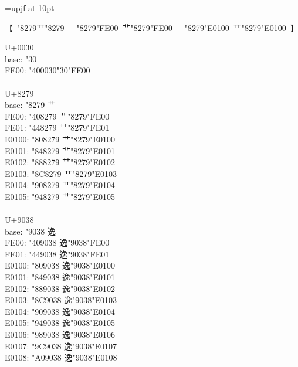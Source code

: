 \documentclass{ujarticle}
\begin{document}
\pagestyle{empty}
\parindent0pt
\begin{multicols*}{4}

\newcommand{\VS}{\\}
\font\upjf=upjf at 10pt
\upjf

\hbox{【
 \kchar"8279艹\Uchar"8279 ~%
 \kchar"8279\kchar"FE00 艹︀\Uchar"8279\Uchar"FE00 ~%
 \kchar"8279\kchar"E0100 艹󠄀\Uchar"8279\Uchar"E0100 %
】}

U+0030\\
base: \kchar"30\\
FE00: \kchar"400030\kchar"30\kchar"FE00\\
\VS
U+8279\\
base: \kchar"8279 艹\\
FE00: \kchar"408279 艹︀\kchar"8279\kchar"FE00\\
FE01: \kchar"448279 艹︁\kchar"8279\kchar"FE01\\
E0100: \kchar"808279 艹󠄀\kchar"8279\kchar"E0100\\
E0101: \kchar"848279 艹󠄁\kchar"8279\kchar"E0101\\
E0102: \kchar"888279 艹󠄂\kchar"8279\kchar"E0102\\
E0103: \kchar"8C8279 艹󠄃\kchar"8279\kchar"E0103\\
E0104: \kchar"908279 艹󠄄\kchar"8279\kchar"E0104\\
E0105: \kchar"948279 艹󠄅\kchar"8279\kchar"E0105\\
\VS
U+9038\\
base: \kchar"9038 逸\\
FE00: \kchar"409038 逸︀\kchar"9038\kchar"FE00\\
FE01: \kchar"449038 逸︁\kchar"9038\kchar"FE01\\
E0100: \kchar"809038 逸󠄀\kchar"9038\kchar"E0100\\
E0101: \kchar"849038 逸󠄁\kchar"9038\kchar"E0101\\
E0102: \kchar"889038 逸󠄂\kchar"9038\kchar"E0102\\
E0103: \kchar"8C9038 逸󠄃\kchar"9038\kchar"E0103\\
E0104: \kchar"909038 逸󠄄\kchar"9038\kchar"E0104\\
E0105: \kchar"949038 逸󠄅\kchar"9038\kchar"E0105\\
E0106: \kchar"989038 逸󠄆\kchar"9038\kchar"E0106\\
E0107: \kchar"9C9038 逸󠄇\kchar"9038\kchar"E0107\\
E0108: \kchar"A09038 逸󠄈\kchar"9038\kchar"E0108\\

\end{multicols*}
\end{document}
